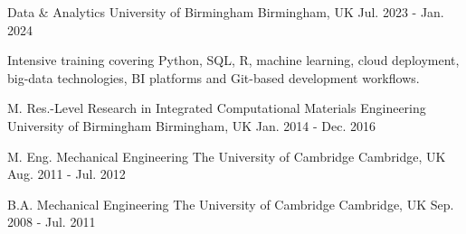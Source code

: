 
\begin{cventries}

  \cventry
  {Data \& Analytics} %
  {University of Birmingham} %
  {Birmingham, UK} %
  {Jul. 2023 - Jan. 2024} %
  {
    \begin{cvitems} %
    \item {Intensive training covering Python, SQL, R, machine learning, cloud deployment, big-data technologies, BI platforms and Git-based development workflows.}
    \end{cvitems}
  }

  \cventry
  {M. Res.-Level Research in Integrated Computational Materials Engineering} %
  {University of Birmingham} %
  {Birmingham, UK} %
  {Jan. 2014 - Dec. 2016} %
  {
  }

  \cventry
  {M. Eng. Mechanical Engineering} %
  {The University of Cambridge} %
  {Cambridge, UK} %
  {Aug. 2011 - Jul. 2012} %
  {
  }

  \cventry
  {B.A. Mechanical Engineering} %
  {The University of Cambridge} %
  {Cambridge, UK} %
  {Sep. 2008 - Jul. 2011} %
  {
  }

\end{cventries}

